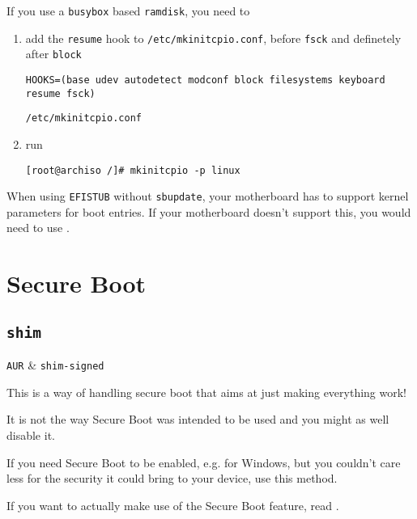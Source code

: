 \documentclass[10pt]{dustdoc}
\begin{document}
\begin{NOTE}
    If you use a \texttt{busybox} based \texttt{ramdisk}, you need to

    \begin{enumerate}
        \item add the \texttt{resume} hook to \texttt{/etc/mkinitcpio.conf}, before \texttt{fsck} and definetely after \texttt{block}

            \begin{mintedlisting}
                \begin{verbatim}
HOOKS=(base udev autodetect modconf block filesystems keyboard resume fsck)
                \end{verbatim}

                \caption{\texttt{/etc/mkinitcpio.conf}}
            \end{mintedlisting}
        \item run

            \begin{verbatim}
[root@archiso /]# mkinitcpio -p linux
            \end{verbatim}
    \end{enumerate}
\end{NOTE}

\begin{NOTE}
    When using \texttt{EFISTUB} without \texttt{sbupdate}, your motherboard has to support kernel parameters for boot entries.
    If your motherboard doesn’t support this, you would need to use .
\end{NOTE}

\section{Secure Boot}
\label{sec:secure-boot}

\subsection{\texttt{shim}}
\label{sec:shim}

\begin{packagetable}
    \texttt{AUR} & \texttt{shim-signed} \\
\end{packagetable}

\begin{WARNING}
    This is a way of handling secure boot that aims at just making everything work!

    It is not the way Secure Boot was intended to be used and you might as well disable it.

    If you need Secure Boot to be enabled, e.g. for Windows, but you couldn’t care less for the security it could bring to your device, use this method.

    If you want to actually make use of the Secure Boot feature, read .
\end{WARNING}
\end{document}
